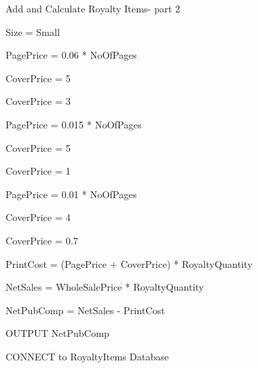 \begin{algorithm}[H]
    \caption{Add and Calculate Royalty Items- part 2}
\begin{algorithmic}[1]


    Size = Small

    PagePrice = 0.06 * NoOfPages

        
        CoverPrice = 5
   
    \EndIf    


        CoverPrice = 3

    \EndIf

\EndIf



        PagePrice = 0.015 * NoOfPages

            
            CoverPrice = 5

        \EndIf

            
            CoverPrice = 1
    
        \EndIf   

    \EndIf
 

        PagePrice = 0.01 * NoOfPages

            
            CoverPrice = 4      

        \EndIf

            CoverPrice = 0.7

        \EndIf    
        
    \EndIf

\EndIf

PrintCost = (PagePrice + CoverPrice) * RoyaltyQuantity


    NetSales = WholeSalePrice * RoyaltyQuantity

    NetPubComp = NetSales - PrintCost

    OUTPUT NetPubComp

\EndIf

    
    CONNECT to RoyaltyItems Database
    
\EndIf

\end{algorithmic}
\end{algorithm}


